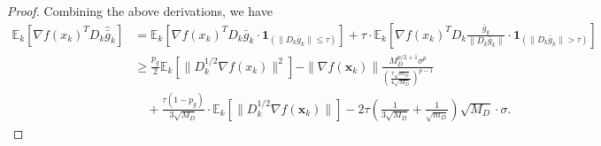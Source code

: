 \documentclass{article}
\newcommand{\bx}{\boldsymbol{x}}
\newcommand{\barg}{\bar{g}}
\theoremstyle{plain}
\theoremstyle{definition}
\theoremstyle{remark}
\begin{document}
\begin{proof}
Combining the above derivations, we have
\begin{align*}
    \mathbb{E}_k[\nabla f(x_k)^T D_k \widehat{\barg}_k ] & = \mathbb{E}_k[\nabla f(x_k)^T D_k \bar{g}_k \cdot \boldsymbol{1}_{(\|D_k\bar{g}_k\| \le \tau)}]  + \tau \cdot \mathbb{E}_k\left[\nabla f(x_k)^T D_k \frac{\bar{g}_k}{\|D_k\bar{g}_k\|} \cdot \boldsymbol{1}_{(\|D_k\bar{g}_k\| > \tau) } \right] \\
    & \geq \frac{p_g}{2}\mathbb{E}_k[\| D_k^{1/2} \nabla f(x_k)\|^2] -  \|\nabla f(\bx_k)\|\frac{M_D^{p/2+1} \sigma^p}{\left(\frac{\tau\sqrt{m_D}}{4\sqrt{M_D}}\right)^{p-1}}\\
    & \quad +  \frac{\tau (1-p_g)}{3\sqrt{M_D}} \cdot \mathbb{E}_k\left[\| D_k^{1/2}\nabla f(\bx_k)\|\right]  - 2\tau \left( \frac{1}{3\sqrt{M_D}} + \frac{1}{\sqrt{m_D}}\right) \sqrt{M_D} \cdot \sigma .
\end{align*}


\end{proof}
\end{document}
